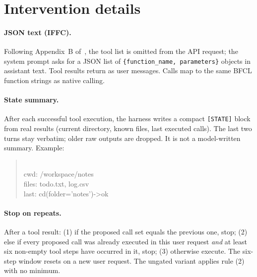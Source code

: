 \documentclass[11pt]{article}
\begin{document}
\appendix

\section{Intervention details}
\label{app:method}

\paragraph{JSON text (IFFC).} Following Appendix~B of~\cite{taheri2026iffc}, the tool list is omitted from the API request; the system prompt asks for a JSON list of \texttt{\{function\_name, parameters\}} objects in assistant text. Tool results return as user messages. Calls map to the same BFCL function strings as native calling.

\paragraph{State summary.} After each successful tool execution, the harness writes a compact \texttt{[STATE]} block from real results (current directory, known files, last executed calls). The last two turns stay verbatim; older raw outputs are dropped. It is not a model-written summary. Example:
\begin{quote}\footnotesize\ttfamily
[STATE]\\ cwd: /workspace/notes\\ files: todo.txt, log.csv\\ last: cd(folder='notes')->ok
\end{quote}

\paragraph{Stop on repeats.} After a tool result: (1) if the proposed call set equals the previous one, stop; (2) else if every proposed call was already executed in this user request \emph{and} at least six non-empty tool steps have occurred in it, stop; (3) otherwise execute. The six-step window resets on a new user request. The ungated variant applies rule (2) with no minimum.
\end{document}
